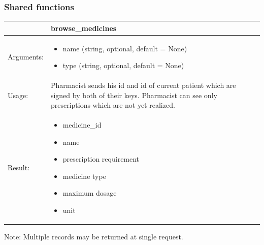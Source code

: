 \subsubsection{Shared functions}
\begin{table} [h]
    \begin{tabular}{| p{6cm} | p{7.75cm} |}
    \hline
     & browse\_medicines \\ \hline
    Arguments: &  \begin{itemize}
    \item name (string, optional, default = None)
    \item type (string, optional, default = None)
	\end{itemize}        \\ \hline
    Usage: & Pharmacist sends his id and id of current patient which are signed by both of their keys. Pharmacist can see only prescriptions which are not yet realized. \\ \hline
    Result: & \begin{itemize}
    	\item medicine\_id
    	\item name
    	\item prescription requirement
    	\item medicine type
    	\item maximum dosage
    	\item unit
	\end{itemize}     \\ \hline	
    \end{tabular}
\end{table}
Note: Multiple records may be returned at single request.
